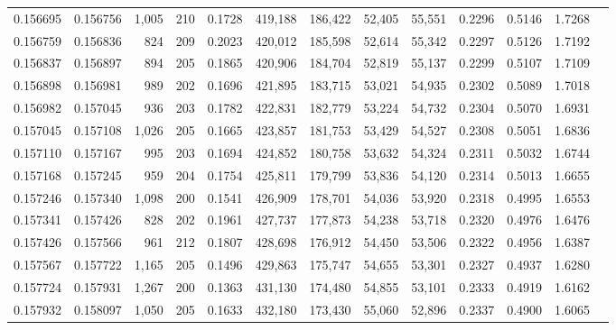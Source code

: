 \begin{tabular}{rrrrrrrrrrrrr}
0.156695 & 0.156756 & 1,005 & 210 &                                     0.1728 & 419,188 & 186,422 &  52,405 &  55,551 & 0.2296 & 0.5146 & 1.7268 \\
0.156759 & 0.156836 &   824 & 209 &                                     0.2023 & 420,012 & 185,598 &  52,614 &  55,342 & 0.2297 & 0.5126 & 1.7192 \\
0.156837 & 0.156897 &   894 & 205 &                                     0.1865 & 420,906 & 184,704 &  52,819 &  55,137 & 0.2299 & 0.5107 & 1.7109 \\
0.156898 & 0.156981 &   989 & 202 &                                     0.1696 & 421,895 & 183,715 &  53,021 &  54,935 & 0.2302 & 0.5089 & 1.7018 \\
0.156982 & 0.157045 &   936 & 203 &                                     0.1782 & 422,831 & 182,779 &  53,224 &  54,732 & 0.2304 & 0.5070 & 1.6931 \\
0.157045 & 0.157108 & 1,026 & 205 &                                     0.1665 & 423,857 & 181,753 &  53,429 &  54,527 & 0.2308 & 0.5051 & 1.6836 \\
0.157110 & 0.157167 &   995 & 203 &                                     0.1694 & 424,852 & 180,758 &  53,632 &  54,324 & 0.2311 & 0.5032 & 1.6744 \\
0.157168 & 0.157245 &   959 & 204 &                                     0.1754 & 425,811 & 179,799 &  53,836 &  54,120 & 0.2314 & 0.5013 & 1.6655 \\
0.157246 & 0.157340 & 1,098 & 200 &                                     0.1541 & 426,909 & 178,701 &  54,036 &  53,920 & 0.2318 & 0.4995 & 1.6553 \\
0.157341 & 0.157426 &   828 & 202 &                                     0.1961 & 427,737 & 177,873 &  54,238 &  53,718 & 0.2320 & 0.4976 & 1.6476 \\
0.157426 & 0.157566 &   961 & 212 &                                     0.1807 & 428,698 & 176,912 &  54,450 &  53,506 & 0.2322 & 0.4956 & 1.6387 \\
0.157567 & 0.157722 & 1,165 & 205 &                                     0.1496 & 429,863 & 175,747 &  54,655 &  53,301 & 0.2327 & 0.4937 & 1.6280 \\
0.157724 & 0.157931 & 1,267 & 200 &                                     0.1363 & 431,130 & 174,480 &  54,855 &  53,101 & 0.2333 & 0.4919 & 1.6162 \\
0.157932 & 0.158097 & 1,050 & 205 &                                     0.1633 & 432,180 & 173,430 &  55,060 &  52,896 & 0.2337 & 0.4900 & 1.6065 \\

\end{tabular}
